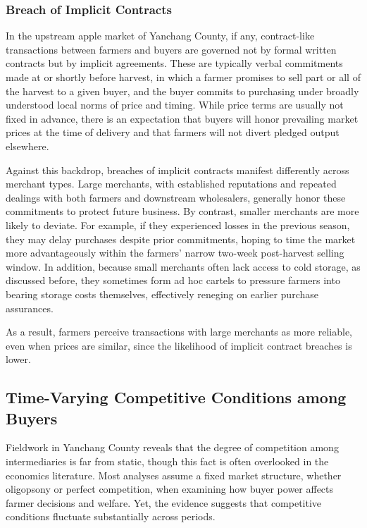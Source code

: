 \subsubsection{Breach of Implicit Contracts}
\noindent 
In the upstream apple market of Yanchang County, if any, contract-like transactions between farmers and buyers are governed not by formal written contracts but by implicit agreements. These are typically verbal commitments made at or shortly before harvest, in which a farmer promises to sell part or all of the harvest to a given buyer, and the buyer commits to purchasing under broadly understood local norms of price and timing. While price terms are usually not fixed in advance, there is an expectation that buyers will honor prevailing market prices at the time of delivery and that farmers will not divert pledged output elsewhere.

Against this backdrop, breaches of implicit contracts manifest differently across merchant types. Large merchants, with established reputations and repeated dealings with both farmers and downstream wholesalers, generally honor these commitments to protect future business. By contrast, smaller merchants are more likely to deviate. For example, if they experienced losses in the previous season, they may delay purchases despite prior commitments, hoping to time the market more advantageously within the farmers' narrow two-week post-harvest selling window. In addition, because small merchants often lack access to cold storage, as discussed before, they sometimes form ad hoc cartels to pressure farmers into bearing storage costs themselves, effectively reneging on earlier purchase assurances.  

As a result, farmers perceive transactions with large merchants as more reliable, even when prices are similar, since the likelihood of implicit contract breaches is lower.









\subsection{Time-Varying Competitive Conditions among Buyers}
\noindent 
Fieldwork in Yanchang County reveals that the degree of competition among intermediaries is far from static, though this fact is often overlooked in the economics literature. Most analyses assume a fixed market structure, whether oligopsony or perfect competition, when examining how buyer power affects farmer decisions and welfare. Yet, the evidence suggests that competitive conditions fluctuate substantially across periods.  

